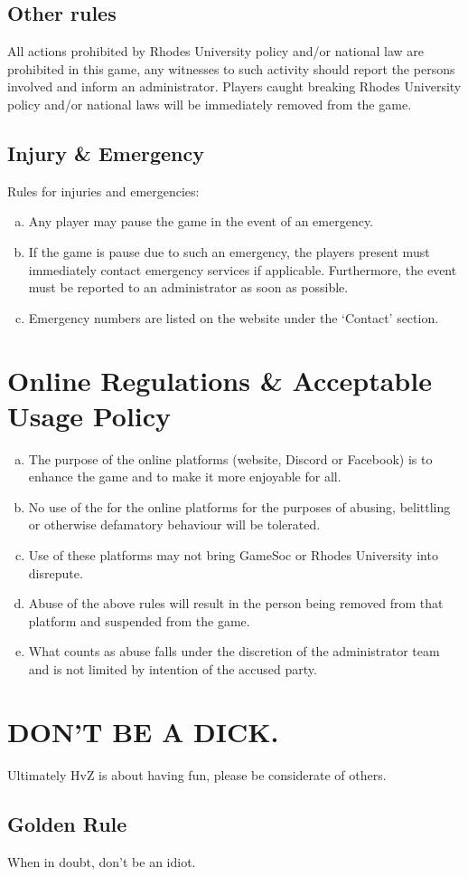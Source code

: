 \documentclass[a4paper,12pt]{article}
\begin{document}
\subsection{Other rules}
All actions prohibited by Rhodes University policy and/or national law are prohibited in this game, any witnesses to such activity should report the persons involved and inform an administrator. Players caught breaking Rhodes University policy and/or national laws will be immediately removed from the game. 

\subsection{Injury \& Emergency}

Rules for injuries and emergencies:
\begin{enumerate}[(a)]
    \item Any player may pause the game in the event of an emergency.
    \item If the game is pause due to such an emergency, the players present must immediately contact emergency services if applicable. Furthermore, the event must be reported to an administrator as soon as possible.
    \item Emergency numbers are listed on the website under the `Contact' section.
\end{enumerate}

\section{Online Regulations \& Acceptable Usage Policy}
\begin{enumerate}[(a)]
\item The purpose of the online platforms (website, Discord or Facebook) is to enhance the game and to make it more enjoyable for all. 
\item  No use of the for the online platforms for the purposes of abusing, belittling or otherwise defamatory behaviour will be tolerated.
\item Use of these platforms may not bring GameSoc or Rhodes University into disrepute.
\item Abuse of the above rules will result in the person being removed from that platform and suspended from the game. 
\item What counts as abuse falls under the discretion of the administrator team and is not limited by intention of the accused party.
\end{enumerate}

\section{DON'T BE A DICK.}
\label{dbad}
Ultimately HvZ is about having fun, please be considerate of others.
\subsection{Golden Rule}
When in doubt, don't be an idiot.



\end{document}
